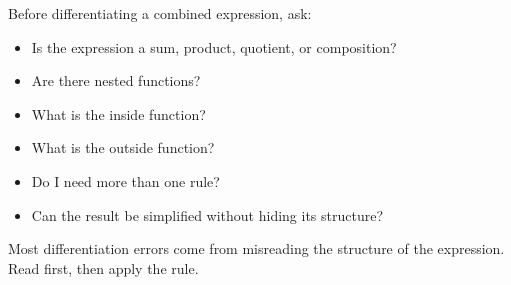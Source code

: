 \begin{summarybox}
Before differentiating a combined expression, ask:
\begin{itemize}
\item Is the expression a sum, product, quotient, or composition?
\item Are there nested functions?
\item What is the inside function?
\item What is the outside function?
\item Do I need more than one rule?
\item Can the result be simplified without hiding its structure?
\end{itemize}
\end{summarybox}

Most differentiation errors come from misreading the structure of the expression. Read first, then apply the rule.